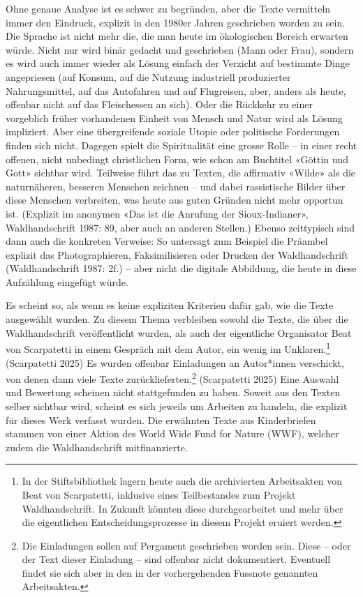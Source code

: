 \documentclass[a4paper,
fontsize=11pt,
oneside,
numbers=noperiodatend,
parskip=half-,
bibliography=totoc,
final
]{scrartcl}
\begin{document}
Ohne genaue Analyse ist es schwer zu begründen, aber die Texte
vermitteln immer den Eindruck, explizit in den 1980er Jahren geschrieben
worden zu sein. Die Sprache ist nicht mehr die, die man heute im
ökologischen Bereich erwarten würde. Nicht nur wird binär gedacht und
geschrieben (Mann oder Frau), sondern es wird auch immer wieder als
Lösung einfach der Verzicht auf bestimmte Dinge angepriesen (auf Konsum,
auf die Nutzung industriell produzierter Nahrungsmittel, auf das
Autofahren und auf Flugreisen, aber, anders als heute, offenbar nicht
auf das Fleischessen an sich). Oder die Rückkehr zu einer vorgeblich
früher vorhandenen Einheit von Mensch und Natur wird als Lösung
impliziert. Aber eine übergreifende soziale Utopie oder politische
Forderungen finden sich nicht. Dagegen spielt die Spiritualität eine
grosse Rolle -- in einer recht offenen, nicht unbedingt christlichen
Form, wie schon am Buchtitel «Göttin und Gott» sichtbar wird. Teilweise
führt das zu Texten, die affirmativ «Wilde» als die naturnäheren,
besseren Menschen zeichnen -- und dabei rassistische Bilder über diese
Menschen verbreiten, was heute aus guten Gründen nicht mehr opportun
ist. (Explizit im anonymen «Das ist die Anrufung der Sioux-Indianer»,
Waldhandschrift 1987: 89, aber auch an anderen Stellen.) Ebenso
zeittypisch sind dann auch die konkreten Verweise: So untersagt zum
Beispiel die Präambel explizit das Photographieren, Faksimilisieren oder
Drucken der Waldhandschrift (Waldhandschrift 1987: 2f.) -- aber nicht
die digitale Abbildung, die heute in diese Aufzählung eingefügt würde.

Es scheint so, als wenn es keine expliziten Kriterien dafür gab, wie die
Texte ausgewählt wurden. Zu diesem Thema verbleiben sowohl die Texte,
die über die Waldhandschrift veröffentlicht wurden, als auch der
eigentliche Organisator Beat von Scarpatetti in einem Gespräch mit dem
Autor, ein wenig im Unklaren.\footnote{In der Stiftsbibliothek lagern
  heute auch die archivierten Arbeitsakten von Beat von Scarpatetti,
  inklusive eines Teilbestandes zum Projekt Waldhandschrift. In Zukunft
  könnten diese durchgearbeitet und mehr über die eigentlichen
  Entscheidungsprozesse in diesem Projekt eruiert werden.} (Scarpatetti
2025) Es wurden offenbar Einladungen an Autor*innen verschickt, von
denen dann viele Texte zurücklieferten.\footnote{Die Einladungen sollen
  auf Pergament geschrieben worden sein. Diese -- oder der Text dieser
  Einladung -- sind offenbar nicht dokumentiert. Eventuell findet sie
  sich aber in den in der vorhergehenden Fussnote genannten
  Arbeitsakten.} (Scarpatetti 2025) Eine Auswahl und Bewertung scheinen
nicht stattgefunden zu haben. Soweit aus den Texten selber sichtbar
wird, scheint es sich jeweils um Arbeiten zu handeln, die explizit für
dieses Werk verfasst wurden. Die erwähnten Texte aus Kinderbriefen
stammen von einer Aktion des World Wide Fund for Nature (WWF), welcher
zudem die Waldhandschrift mitfinanzierte.
\end{document}
